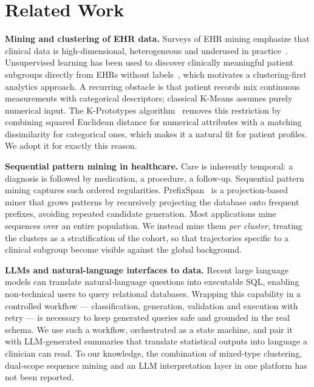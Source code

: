 \section{Related Work}\label{sec:related}

\textbf{Mining and clustering of EHR data.} Surveys of EHR mining emphasize that
clinical data is high-dimensional, heterogeneous and underused in
practice~\cite{Yadav2018MiningEHR}. Unsupervised learning has been used to
discover clinically meaningful patient subgroups directly from EHRs without
labels~\cite{Wang2020UnsupervisedEHR}, which motivates a clustering-first
analytics approach. A recurring obstacle is that patient records mix continuous
measurements with categorical descriptors; classical K-Means assumes purely
numerical input. The K-Prototypes algorithm~\cite{Huang1998KPrototypes} removes
this restriction by combining squared Euclidean distance for numerical
attributes with a matching dissimilarity for categorical ones, which makes it a
natural fit for patient profiles. We adopt it for exactly this reason.

\textbf{Sequential pattern mining in healthcare.} Care is inherently temporal: a
diagnosis is followed by medication, a procedure, a follow-up. Sequential pattern
mining captures such ordered regularities. PrefixSpan~\cite{Pei2004PrefixSpan} is
a projection-based miner that grows patterns by recursively projecting the
database onto frequent prefixes, avoiding repeated candidate generation. Most
applications mine sequences over an entire population. We instead mine them
\emph{per cluster}, treating the clusters as a stratification of the cohort, so
that trajectories specific to a clinical subgroup become visible against the
global background.

\textbf{LLMs and natural-language interfaces to data.} Recent large language
models can translate natural-language questions into executable SQL, enabling
non-technical users to query relational databases. Wrapping this capability in a
controlled workflow --- classification, generation, validation and execution
with retry --- is necessary to keep generated queries safe and grounded in the
real schema. We use such a workflow, orchestrated as a state machine, and pair
it with LLM-generated summaries that translate statistical outputs into language
a clinician can read. To our knowledge, the combination of mixed-type
clustering, dual-scope sequence mining and an LLM interpretation layer in one
platform has not been reported.
